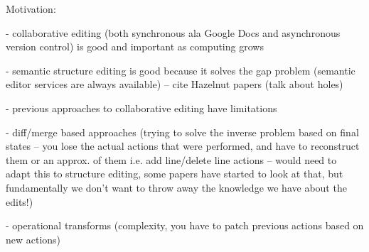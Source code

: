 




\newpage




Motivation:

- collaborative editing (both synchronous ala Google Docs and asynchronous version control)
is good and important as computing grows

- semantic structure editing is good because it solves the gap problem (semantic editor services
are always available) -- cite Hazelnut papers (talk about holes)

- previous approaches to collaborative editing have limitations

- diff/merge based approaches (trying to solve the inverse problem based on final states --
you lose the actual actions that were performed, and have to reconstruct them or an approx.
of them i.e. add line/delete line actions -- would need to adapt this to structure editing,
some papers have started to look at that, but fundamentally we don't want to throw away the
knowledge we have about the edits!)

- operational transforms (complexity, you have to patch previous actions based on new actions)

